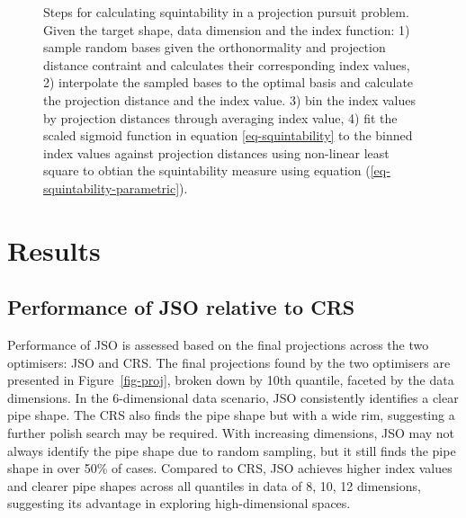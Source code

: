 \documentclass[
  12pt,
]{interact}
\theoremstyle{plain}
\begin{document}
\begin{figure}


\caption{\label{fig-squintability}Steps for calculating squintability in
a projection pursuit problem. Given the target shape, data dimension and
the index function: 1) sample random bases given the orthonormality and
projection distance contraint and calculates their corresponding index
values, 2) interpolate the sampled bases to the optimal basis and
calculate the projection distance and the index value. 3) bin the index
values by projection distances through averaging index value, 4) fit the
scaled sigmoid function in equation \eqref{eq-squintability} to the
binned index values against projection distances using non-linear least
square to obtian the squintability measure using equation
(\ref{eq-squintability-parametric}).}

\end{figure}%

\section{Results}\label{sec-sim-res}

\subsection{Performance of JSO relative to
CRS}\label{performance-of-jso-relative-to-crs}

Performance of JSO is assessed based on the final projections across the
two optimisers: JSO and CRS. The final projections found by the two
optimisers are presented in Figure~\ref{fig-proj}, broken down by 10th
quantile, faceted by the data dimensions. In the 6-dimensional data
scenario, JSO consistently identifies a clear pipe shape. The CRS also
finds the pipe shape but with a wide rim, suggesting a further polish
search may be required. With increasing dimensions, JSO may not always
identify the pipe shape due to random sampling, but it still finds the
pipe shape in over 50\% of cases. Compared to CRS, JSO achieves higher
index values and clearer pipe shapes across all quantiles in data of 8,
10, 12 dimensions, suggesting its advantage in exploring
high-dimensional spaces.
\end{document}
